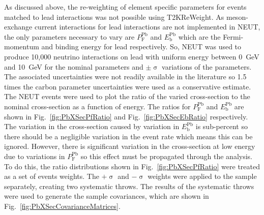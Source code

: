 As discussed above, the re-weighting of element specific parameters for events matched to lead interactions was not possible using T2KReWeight.  As meson-exchange current interactions for lead interactions are not implemented in NEUT, the only parameters necessary to vary are $P_{\textrm{F}}^{\textrm{Pb}}$ and $E_{\textrm{b}}^{\textrm{Pb}}$ which are the Fermi-momentum and binding energy for lead respectively.  So, NEUT was used to produce 10,000 neutrino interactions on lead with uniform energy between 0~GeV and 10~GeV for the nominal parameters and $\pm\upsigma$ variations of the parameters.  The associated uncertainties were not readily available in the literature so 1.5 times the carbon parameter uncertainties were used as a conservative estimate.  The NEUT events were used to plot the ratio of the varied cross-section to the nominal cross-section as a function of energy.  The ratios for $P_{\textrm{F}}^{\textrm{Pb}}$ and $E_{\textrm{b}}^{\textrm{Pb}}$ are shown in Fig.~\ref{fig:PbXSecPfRatio} and Fig.~\ref{fig:PbXSecEbRatio} respectively.  The variation in the cross-section caused by variation in $E_{\textrm{b}}^{\textrm{Pb}}$ is sub-percent so there should be a negligible variation in the event rate which means this can be ignored.  However, there is significant variation in the cross-section at low energy due to variations in $P_{\textrm{F}}^{\textrm{Pb}}$ so this effect must be propagated through the analysis.  To do this, the ratio distributions shown in Fig.~\ref{fig:PbXSecPfRatio} were treated as a set of events weights.  The $+\upsigma$ and $-\upsigma$ weights were applied to the sample separately, creating two systematic throws.  The results of the systematic throws were used to generate the sample covariances, which are shown in Fig.~\ref{fig:PbXSecCovarianceMatrices}.
